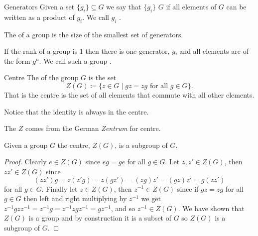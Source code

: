 \documentclass[fleqn]{NotesClass}
\begin{document}
    \begin{dfn}{Generators}{}
        Given a set \(\{g_i\} \subseteq G\) we say that \(\{g_i\}\)  \(G\) if all elements of \(G\) can be written as a product of \(g_i\).
        We call \(g_i\) .
        
        The  of a group is the size of the smallest set of generators. 
        
        If the rank of a group is 1 then there is one generator, \(g\), and all elements are of the form \(g^n\).
        We call such a group .
    \end{dfn}
    
    \begin{dfn}{Centre}{}
        The  of the group \(G\) is the set
        \begin{equation}
            Z(G) \coloneqq \{z \in G \mid gz = zg \text{ for all } g \in G\}.
        \end{equation}
        That is the centre is the set of all elements that commute with all other elements.
        
        \begin{rmk}
            Notice that the identity is always in the centre.
        \end{rmk}
        \begin{rmk}
            The \(Z\) comes from the German \textit{Zentrum} for centre.
        \end{rmk}
    \end{dfn}
    
    \begin{lma}{}{}
        Given a group \(G\) the centre, \(Z(G)\), is a subgroup of \(G\).
        \begin{proof}
            Clearly \(e \in Z(G)\) since \(eg = ge\) for all \(g \in G\).
            Let \(z, z' \in Z(G)\), then \(zz' \in Z(G)\) since 
            \begin{equation}
                (zz')g = z(z'g) = z(gz') = (zg)z' = (gz)z' = g(zz')
            \end{equation}
            for all \(g \in G\).
            Finally let \(z \in Z(G)\), then \(z^{-1} \in Z(G)\) since if \(gz = zg\) for all \(g \in G\) then left and right multiplying by \(z^{-1}\) we get \(z^{-1}gzz^{-1} = z^{-1}g = z^{-1}zgz^{-1} = gz^{-1}\), and so \(z^{-1} \in Z(G)\).
            We have shown that \(Z(G)\) is a group and by construction it is a subset of \(G\) so \(Z(G)\) is a subgroup of \(G\).
        \end{proof}
    \end{lma}
    
\end{document}
